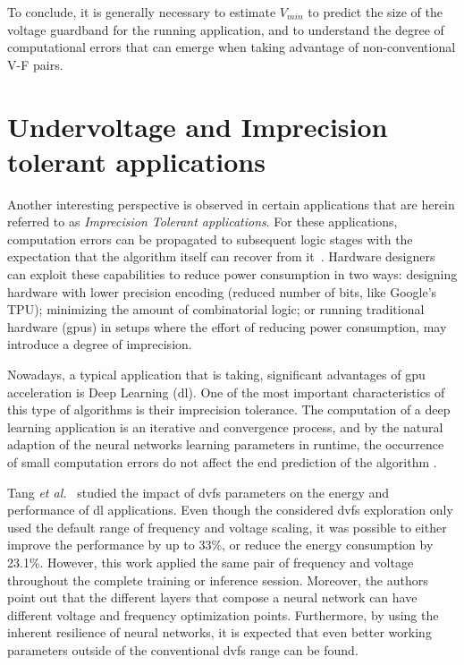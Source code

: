 To conclude, it is generally necessary to estimate $V_{min}$ to predict the size of the voltage guardband for the running application, and to understand the degree of computational errors that can emerge when taking advantage of non-conventional V-F pairs.

\section{Undervoltage and Imprecision tolerant applications}
\label{sec:under_int_app}
Another interesting perspective is observed in certain applications that are herein referred to as \textit{Imprecision Tolerant applications}. For these applications, computation errors can be propagated to subsequent logic stages with the expectation that the algorithm itself can recover from it~\cite{nakhaee_lifetime_2018}. Hardware designers can exploit these capabilities to reduce power consumption in two ways: designing hardware with lower precision encoding (reduced number of bits, like Google's TPU); minimizing the amount of combinatorial logic; or running traditional hardware (\acrshort{gpu}s) in setups where the effort of reducing power consumption, may introduce a degree of imprecision.

Nowadays, a typical application that is taking,  significant advantages of \acrshort{gpu} acceleration is Deep Learning (\acrshort{dl}). One of the most important characteristics of this type of algorithms is their imprecision tolerance. The computation of a deep learning application is an iterative and convergence process, and by the natural adaption of the neural networks learning parameters in runtime, the occurrence of small computation errors do not affect the end prediction of the algorithm \cite{jiao_assessment_2017}.

Tang \textit{et al.}~\cite{tang_impact_2019} studied the impact of \acrshort{dvfs} parameters on the energy and performance of \acrshort{dl} applications. Even though the considered \acrshort{dvfs} exploration only used the default range of frequency and voltage scaling, it was possible to either improve the performance by up to 33\%, or reduce the energy consumption by 23.1\%. However, this work applied the same pair of frequency and voltage throughout the complete training or inference session. Moreover, the authors point out that the different layers that compose a neural network can have different voltage and frequency optimization points. Furthermore, by using the inherent resilience of neural networks, it is expected that even better working parameters outside of the conventional \acrshort{dvfs} range can be found. 

